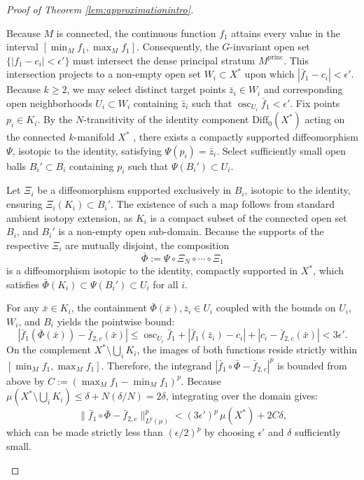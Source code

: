 \documentclass[12pt,a4paper]{amsart}
\theoremstyle{plain}
\theoremstyle{definition}
\theoremstyle{remark}
\begin{document}
\begin{proof}[Proof of Theorem \ref{lem:approximationintro}]
\begin{enumerate}[label=\textup{(\alph*)}, font=\upshape]
  Because $M$ is connected, the continuous function $f_1$ attains every value in the interval $[\min_M f_1, \max_M f_1]$. Consequently, the $G$-invariant open set $\{|f_1 - c_i| < \epsilon'\}$ must intersect the dense principal stratum $M^{\mathrm{princ}}$. This intersection projects to a non-empty open set $W_i \subset X^*$ upon which $|\bar{f}_1 - c_i| < \epsilon'$. Because $k \ge 2$, we may select distinct target points $\bar{z}_i \in W_i$ and corresponding open neighborhoods $U_i \subset W_i$ containing $\bar{z}_i$ such that $\operatorname{osc}_{U_i} \bar{f}_1 < \epsilon'$. Fix points $p_i \in K_i$. By the $N$-transitivity of the identity component $\mathrm{Diff}_0(X^*)$ acting on the connected $k$-manifold $X^*$ \cites{Kankaanrinta2025, Boothby}, there exists a compactly supported diffeomorphism $\Psi$, isotopic to the identity, satisfying $\Psi(p_i) = \bar{z}_i$. Select sufficiently small open balls $B_i' \subset B_i$ containing $p_i$ such that $\Psi(B_i') \subset U_i$. 

  Let $\Xi_i$ be a diffeomorphism supported exclusively in $B_i$, isotopic to the identity, ensuring $\Xi_i(K_i) \subset B_i'$. The existence of such a map follows from standard ambient isotopy extension, as $K_i$ is a compact subset of the connected open set $B_i$, and $B_i'$ is a non-empty open sub-domain. Because the supports of the respective $\Xi_i$ are mutually disjoint, the composition
  \[
    \bar{\Phi} := \Psi \circ \Xi_N \circ \cdots \circ \Xi_1
  \]
  is a diffeomorphism isotopic to the identity, compactly supported in $X^*$, which satisfies $\bar{\Phi}(K_i) \subset \Psi(B_i') \subset U_i$ for all $i$.

  For any $\bar{x} \in K_i$, the containment $\bar{\Phi}(\bar{x}), \bar{z}_i \in U_i$ coupled with the bounds on $U_i$, $W_i$, and $B_i$ yields the pointwise bound:
  \[
    |\bar{f}_1(\bar{\Phi}(\bar{x})) - \bar{f}_{2,c}(\bar{x})| \le \operatorname{osc}_{U_i} \bar{f}_1 + |\bar{f}_1(\bar{z}_i) - c_i| + |c_i - \bar{f}_{2,c}(\bar{x})| < 3\epsilon'.
  \]
  On the complement $X^* \setminus \bigcup_i K_i$, the images of both functions reside strictly within $[\min_M f_1, \max_M f_1]$. Therefore, the integrand $|\bar{f}_1 \circ \bar{\Phi} - \bar{f}_{2,c}|^p$ is bounded from above by $C := (\max_M f_1 - \min_M f_1)^p$. Because $\mu(X^* \setminus \bigcup_i K_i) \le \delta + N(\delta/N) = 2\delta$, integrating over the domain gives:
  \[
    \|\bar{f}_1 \circ \bar{\Phi} - \bar{f}_{2,c}\|_{L^p(\mu)}^p < (3\epsilon')^p\,\mu(X^*) + 2C\delta,
  \]
  which can be made strictly less than $(\epsilon/2)^p$ by choosing $\epsilon'$ and $\delta$ sufficiently small.


\end{enumerate}
\end{proof}
\end{document}
